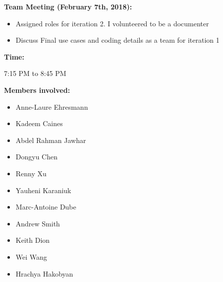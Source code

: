 \documentclass[11pt]{article}
\begin{document}
\textbf{Team Meeting (February 7th, 2018):}
\begin{itemize}

\item Assigned roles for iteration 2. I volunteered to be a documenter
\item Discuss Final use cases and coding details as a team for iteration 1

\end{itemize}

\textbf{Time:}

7:15 PM to 8:45 PM

\textbf{Members involved:}

\begin{itemize}
    \item Anne-Laure	Ehresmann
    \item Kadeem	Caines
\item Abdel Rahman	Jawhar
\item Dongyu	Chen
\item Renny	Xu
\item Yauheni	Karaniuk
\item Marc-Antoine	Dube
\item Andrew	Smith
\item  Keith	Dion
\item   Wei	Wang
\item Hrachya	Hakobyan
\end{itemize}
\end{document}
